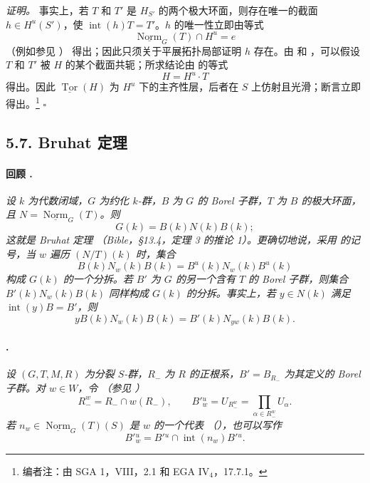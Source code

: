 \textit{证明。}
事实上，若 \(T\) 和 \(T'\) 是 \(H_{S'}\) 的两个极大环面，则存在唯一的截面 \(h\in H^u(S')\)，使 \(\operatorname{int}(h)T=T'\)。\(h\) 的唯一性立即由等式
\[
  \underline{\operatorname{Norm}}_G(T)\cap H^u=e
\]
\textup{（例如参见 ）} 得出；因此只须关于平展拓扑局部证明 \(h\) 存在。由  和 \textup{}，可以假设 \(T\) 和 \(T'\) 被 \(H\) 的某个截面共轭；所求结论由 \textup{} 的等式
\[
  H=H^u\cdot T
\]
得出。因此 \(\underline{\operatorname{Tor}}(H)\) 为 \(H^u\) 下的主齐性层，后者在 \(S\) 上仿射且光滑；断言立即得出。\footnote{编者注：由 SGA 1，VIII，2.1 和 EGA \(\mathrm{IV}_4\)，17.7.1。}
\hfill\(\square\)

\subsection*{5.7. Bruhat 定理}

\paragraph{回顾 .}
\textit{设 \(k\) 为代数闭域，\(G\) 为约化 \(k\)-群，\(B\) 为 \(G\) 的 Borel 子群，\(T\) 为 \(B\) 的极大环面，且 \(N=\underline{\operatorname{Norm}}_G(T)\)。则}
\[
  G(k)=B(k)N(k)B(k);
\]
\textit{这就是 Bruhat 定理 \textup{（\emph{Bible}，\S13.4，定理 3 的推论 1）}。更确切地说，采用  的记号，当 \(w\) 遍历 \((N/T)(k)\) 时，集合}
\[
  B(k)N_w(k)B(k)=B^u(k)N_w(k)B^u(k)
\]
\textit{构成 \(G(k)\) 的一个分拆。若 \(B'\) 为 \(G\) 的另一个含有 \(T\) 的 Borel 子群，则集合 \(B'(k)N_w(k)B(k)\) 同样构成 \(G(k)\) 的分拆。事实上，若 \(y\in N(k)\) 满足 \(\operatorname{int}(y)B=B'\)，则}
\[
  yB(k)N_w(k)B(k)=B'(k)N_{yw}(k)B(k).
\]

\paragraph{.}
\textit{设 \((G,T,M,R)\) 为分裂 \(S\)-群，\(R_-\) 为 \(R\) 的正根系，\(B'=B_{R_-}\) 为其定义的 Borel 子群。对 \(w\in W\)，令 \textup{（参见 ）}}
\[
  R_-^w=R_-\cap w(R_-),
  \qquad
  B'{}^u_w=U_{R_-^w}
  =\prod_{\alpha\in R_-^w}U_\alpha.
\]
\textit{若 \(n_w\in\underline{\operatorname{Norm}}_G(T)(S)\) 是 \(w\) 的一个代表 \textup{（）}，也可以写作}
\[
  B'{}^u_w=B'{}^u\cap\operatorname{int}(n_w)B'{}^u.
\]

